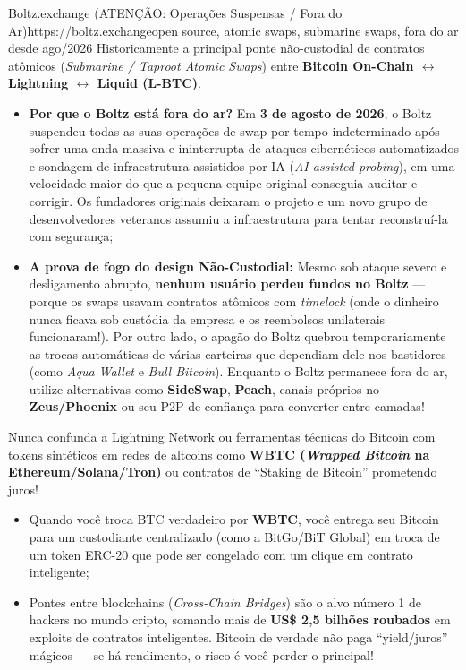 \documentclass{pousadaguide}
\begin{document}
\begin{ferramenta}[logo=boltz]{Boltz.exchange (ATENÇÃO: Operações Suspensas / Fora do Ar)}{https://boltz.exchange}{open source, atomic swaps, submarine swaps, fora do ar desde ago/2026}
Historicamente a principal ponte não-custodial de contratos atômicos (\emph{Submarine / Taproot Atomic Swaps}) entre \textbf{Bitcoin On-Chain $\leftrightarrow$ Lightning $\leftrightarrow$ Liquid (L-BTC)}.
\begin{itemize}
  \item \textbf{Por que o Boltz está fora do ar?} Em \textbf{3 de agosto de 2026}, o Boltz suspendeu todas as suas operações de swap por tempo indeterminado após sofrer uma onda massiva e ininterrupta de ataques cibernéticos automatizados e sondagem de infraestrutura assistidos por IA (\emph{AI-assisted probing}), em uma velocidade maior do que a pequena equipe original conseguia auditar e corrigir. Os fundadores originais deixaram o projeto e um novo grupo de desenvolvedores veteranos assumiu a infraestrutura para tentar reconstruí-la com segurança;
  \item \textbf{A prova de fogo do design Não-Custodial:} Mesmo sob ataque severo e desligamento abrupto, \textbf{nenhum usuário perdeu fundos no Boltz} — porque os swaps usavam contratos atômicos com \emph{timelock} (onde o dinheiro nunca ficava sob custódia da empresa e os reembolsos unilaterais funcionaram!). Por outro lado, o apagão do Boltz quebrou temporariamente as trocas automáticas de várias carteiras que dependiam dele nos bastidores (como \emph{Aqua Wallet} e \emph{Bull Bitcoin}). Enquanto o Boltz permanece fora do ar, utilize alternativas como \textbf{SideSwap}, \textbf{Peach}, canais próprios no \textbf{Zeus/Phoenix} ou seu P2P de confiança para converter entre camadas!
\end{itemize}
\end{ferramenta}

\begin{perigo}
Nunca confunda a Lightning Network ou ferramentas técnicas do Bitcoin com tokens sintéticos em redes de altcoins como \textbf{WBTC (\emph{Wrapped Bitcoin} na Ethereum/Solana/Tron)} ou contratos de ``Staking de Bitcoin'' prometendo juros!
\begin{itemize}
  \item Quando você troca BTC verdadeiro por \textbf{WBTC}, você entrega seu Bitcoin para um custodiante centralizado (como a BitGo/BiT Global) em troca de um token ERC-20 que pode ser congelado com um clique em contrato inteligente;
  \item Pontes entre blockchains (\emph{Cross-Chain Bridges}) são o alvo número 1 de hackers no mundo cripto, somando mais de \textbf{US\$ 2,5 bilhões roubados} em exploits de contratos inteligentes. Bitcoin de verdade não paga ``yield/juros'' mágicos — se há rendimento, o risco é você perder o principal!
\end{itemize}
\end{perigo}
\end{document}

